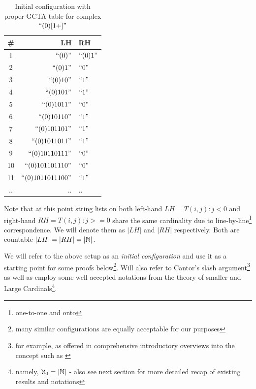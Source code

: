 \begin{table}[ht]
  \caption{Initial configuration with proper GCTA table for complex $\text{``}(0)[1+]\text{''}$}
  \centering
  \begin{tabular}{ |c|r|l| }
    \hline
    \# & LH                      & RH             \\
    \hline
    1  & $\text{``}(0)\text{''}$           & $\text{``}(0)1\text{''}$ \\
    2  & $\text{``}(0)1\text{''}$          & $\text{``}0\text{''}$    \\
    3  & $\text{``}(0)10\text{''}$         & $\text{``}1\text{''}$    \\
    4  & $\text{``}(0)101\text{''}$        & $\text{``}1\text{''}$    \\
    5  & $\text{``}(0)1011\text{''}$       & $\text{``}0\text{''}$    \\
    6  & $\text{``}(0)10110\text{''}$      & $\text{``}1\text{''}$    \\
    7  & $\text{``}(0)101101\text{''}$     & $\text{``}1\text{''}$    \\
    8  & $\text{``}(0)1011011\text{''}$    & $\text{``}1\text{''}$    \\
    9  & $\text{``}(0)10110111\text{''}$   & $\text{``}0\text{''}$    \\
    10 & $\text{``}(0)101101110\text{''}$  & $\text{``}0\text{''}$    \\
    11 & $\text{``}(0)1011011100\text{''}$ & $\text{``}1\text{''}$    \\
    .. & ..                      & ..             \\
    \hline
  \end{tabular}
  \label{Tab:GCGA}
\end{table}

Note that at this point string lists on both left-hand $LH = {T(i,j): j < 0}$ and right-hand $RH = {T(i,j): j >= 0}$ share the same cardinality due to line-by-line\footnote{one-to-one and onto} correspondence. We will denote them as $|LH|$ and $|RH|$ respectively. Both are countable $|LH| = |RH| = |\mathbb{N}|$.

We will refer to the above setup as an \textit{initial configuration} and use it as a starting point for some proofs below\footnote{many similar configurations are equally acceptable for our purposes}. Will also refer to Cantor's slash argument\footnote{for example, as offered in comprehensive introductory overviews into the concept such as \cite{penrose2007road}} as well as employ some well accepted notations from the theory of smaller and Large Cardinals\footnote{namely, $\aleph_0=|\mathbb{N}|$ - also see next section for more detailed recap of existing results and notations}.

